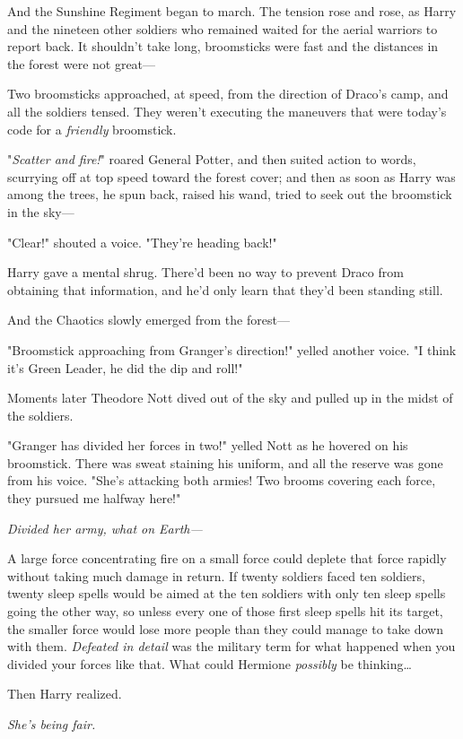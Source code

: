 And the Sunshine Regiment began to march.
\sbreak
The tension rose and rose, as Harry and the nineteen other soldiers who
remained waited for the aerial warriors to report back. It shouldn't take long,
broomsticks were fast and the distances in the forest were not great---

Two broomsticks approached, at speed, from the direction of Draco's camp, and
all the soldiers tensed. They weren't executing the maneuvers that were today's
code for a \emph{friendly} broomstick.

"\emph{Scatter and fire!}" roared General Potter, and then suited action to
words, scurrying off at top speed toward the forest cover; and then as soon as
Harry was among the trees, he spun back, raised his wand, tried to seek out the
broomstick in the sky---

"Clear!" shouted a voice. "They're heading back!"

Harry gave a mental shrug. There'd been no way to prevent Draco from obtaining
that information, and he'd only learn that they'd been standing still.

And the Chaotics slowly emerged from the forest---

"Broomstick approaching from Granger's direction!" yelled another voice. "I
think it's Green Leader, he did the dip and roll!"

Moments later Theodore Nott dived out of the sky and pulled up in the midst of
the soldiers.

"Granger has divided her forces in two!" yelled Nott as he hovered on his
broomstick. There was sweat staining his uniform, and all the reserve was gone
from his voice. "She's attacking both armies! Two brooms covering each force,
they pursued me halfway here!"

\emph{Divided her army, what on Earth---}

A large force concentrating fire on a small force could deplete that force
rapidly without taking much damage in return. If twenty soldiers faced ten
soldiers, twenty sleep spells would be aimed at the ten soldiers with only ten
sleep spells going the other way, so unless every one of those first sleep
spells hit its target, the smaller force would lose more people than they could
manage to take down with them. \emph{Defeated in detail} was the military term
for what happened when you divided your forces like that. What could Hermione
\emph{possibly} be thinking{\ldots}

Then Harry realized.

\emph{She's being fair.}

